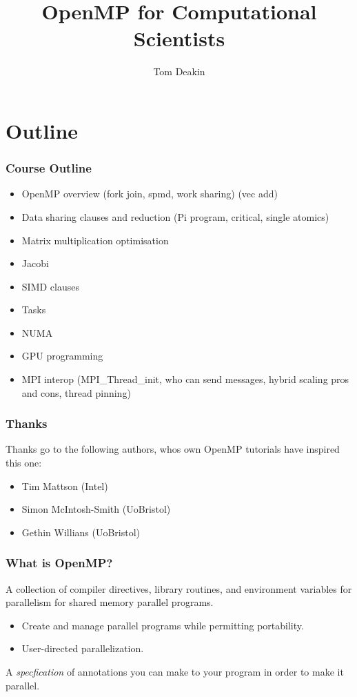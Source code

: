 \documentclass{beamer}
\author{Tom Deakin}
\title{OpenMP for Computational Scientists}
\begin{document}
\frame{\titlepage}

\section{Outline}
\begin{frame}
\frametitle{Course Outline}
\begin{itemize}
  \item OpenMP overview (fork join, spmd, work sharing) (vec add)
  \item Data sharing clauses and reduction (Pi program, critical, single atomics)
  \item Matrix multiplication optimisation
  \item Jacobi
  \item SIMD clauses
  \item Tasks
  \item NUMA
  \item GPU programming
  \item MPI interop (MPI\_Thread\_init, who can send messages, hybrid scaling pros and cons, thread pinning)
\end{itemize}
\end{frame}

\begin{frame}
\frametitle{Thanks}
Thanks go to the following authors, whos own OpenMP tutorials have inspired this one:
\begin{itemize}
  \item Tim Mattson (Intel)
  \item Simon McIntosh-Smith (UoBristol)
  \item Gethin Willians (UoBristol)
\end{itemize}
\end{frame}

\begin{frame}
\frametitle{What is OpenMP?}

A collection of compiler directives, library routines, and environment variables for parallelism for shared memory parallel programs.

\begin{itemize}
  \item Create and manage parallel programs while permitting portability.
  \item User-directed parallelization.
\end{itemize}

A \emph{specfication} of annotations you can make to your program in order to make it parallel.

\end{frame}
\end{document}
